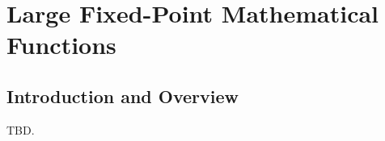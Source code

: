 \chapter{Large Fixed-Point Mathematical Functions}
\label{cfpa3}

\section{Introduction and Overview}
\label{cfpa3:siov0}

TBD.

